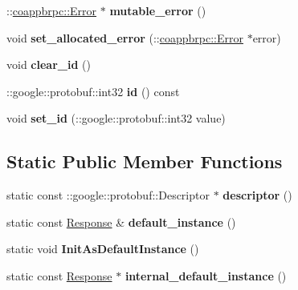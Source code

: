 \begin{DoxyCompactItemize}
\+::\hyperlink{classcoappbrpc_1_1Error}{coappbrpc\+::\+Error} $\ast$ {\bfseries mutable\+\_\+error} ()
\item 
\mbox{\label{classcoappbrpc_1_1Response_aa536601e1f7dcd45fd6fccffa6e15ca9}} 
void {\bfseries set\+\_\+allocated\+\_\+error} (\+::\hyperlink{classcoappbrpc_1_1Error}{coappbrpc\+::\+Error} $\ast$error)
\item 
\mbox{\label{classcoappbrpc_1_1Response_a205de4d84232bde24326a6274d9b8acf}} 
void {\bfseries clear\+\_\+id} ()
\item 
\mbox{\label{classcoappbrpc_1_1Response_a89389be177aab69c762aaf218821bb32}} 
\+::google\+::protobuf\+::int32 {\bfseries id} () const
\item 
\mbox{\label{classcoappbrpc_1_1Response_af23aeab5cc0df75a26500f87e9942cee}} 
void {\bfseries set\+\_\+id} (\+::google\+::protobuf\+::int32 value)
\end{DoxyCompactItemize}
\subsection*{Static Public Member Functions}
\begin{DoxyCompactItemize}
\item 
\mbox{\label{classcoappbrpc_1_1Response_aee7d5c409330433ba6061269965d7dd5}} 
static const \+::google\+::protobuf\+::\+Descriptor $\ast$ {\bfseries descriptor} ()
\item 
\mbox{\label{classcoappbrpc_1_1Response_a61ecfdb459c74f3ce536b878d5759007}} 
static const \hyperlink{classcoappbrpc_1_1Response}{Response} \& {\bfseries default\+\_\+instance} ()
\item 
\mbox{\label{classcoappbrpc_1_1Response_a07665b433b0600546098d98a0afb52d7}} 
static void {\bfseries Init\+As\+Default\+Instance} ()
\item 
\mbox{\label{classcoappbrpc_1_1Response_a0551fd997235f3871029b45c170b70ed}} 
static const \hyperlink{classcoappbrpc_1_1Response}{Response} $\ast$ {\bfseries internal\+\_\+default\+\_\+instance} ()
\end{DoxyCompactItemize}
